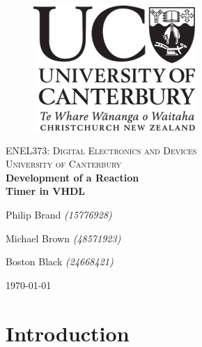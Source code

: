\documentclass[11pt]{article}
\begin{document}
\begin{titlepage}
    \begin{center}
      \begin{figure}
        \includegraphics[right]{logo.png}
      \end{figure}
      \vspace*{1cm}
      \textsc{\large ENEL373: Digital Electronics and Devices}\\[0.5cm]
      \textsc{\Large University of Canterbury}\\[3.5cm]
      \linespread{1}
      {\Huge\bfseries{Development of a Reaction \\[0.3cm] Timer in VHDL}} \\
      \vspace*{2cm}
      {\Huge Philip Brand \textit{\Large(15776928)}\\\par}
      {\Huge Michael Brown \textit{\Large(48571923)}\\\par}
      {\Huge Boston Black \textit{\Large(24668421)}\\\par}
      \vspace*{3cm}
      {\LARGE \today}
    \end{center}
  \end{titlepage}
\restoregeometry

\fancyhead{}
\fancyhead[R]{\small{\today}}


\renewcommand{\baselinestretch}{1.3}\normalsize
\setlength{\cftbeforesecskip}{0.3em}
\renewcommand{\cftsecleader}{\cftdotfill{\cftdotsep}}
\tableofcontents\thispagestyle{fancy}
\renewcommand{\baselinestretch}{1}\normalsize

\newpage
{}

\section{Introduction}
\end{document}
